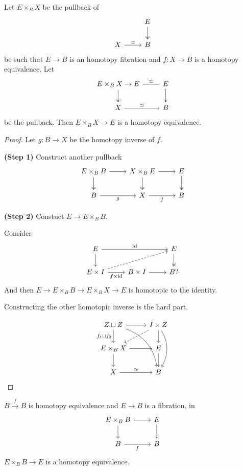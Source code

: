 \documentclass{article}
\DeclareMathOperator{\id}{id}
\begin{document}
\begin{lemma}
	Let $E\times_BX$ be the pullback of
	\[\begin{tikzcd}
		&E\arrow[d,two heads]\\
		X\arrow[r,"\simeq"]&B
	\end{tikzcd}\]
	be such that $E\to B$ is an homotopy fibration and $f:X\to B$ is a homotopy equivalence. Let
	\[\begin{tikzcd}
		E\times_BX\to E\arrow[r,dash,"\simeq"]\arrow[d,two heads]&E\arrow[d,two heads]\\
		X\arrow[r,"\simeq"]&B
	\end{tikzcd}\]
	be the pullback. Then $E\times_BX\to E$ is a homotopy equivalence.
\end{lemma}
\begin{proof}
	Let $g:B\to X$ be the homotopy inverse of $f$.
	
	\textbf{(Step 1)} Construct another pullback
	\[\begin{tikzcd}
		E\times_BB\arrow[r]\arrow[d,two heads]&X\times_BE\arrow[r]\arrow[d,two heads]&E\arrow[d,two heads]\\
		B\arrow[r,"g",swap]&X\arrow[r,"f",swap]&B
	\end{tikzcd}\]
	
	\textbf{(Step 2)} Constuct $E\to E\times_BB$.
	
	Consider
	\[\begin{tikzcd}
		E\arrow[rr,"\id"]\arrow[d]&&E\arrow[d,two heads]\\
		E\times I\arrow[r,"f\times \id",swap]\arrow[rru,dashed]&B\times I\arrow[r]&B?
	\end{tikzcd}\]
	And then $E\to E\times_BB\to E\times_BX\to E$ is homotopic to the identity.
	
	Constructing the other homotopic inverse is the hard part.
	
	\[\begin{tikzcd}
		Z\sqcup Z\arrow[d,swap,"f_1\sqcup f_2"]\arrow[r]\arrow[rdd,bend left]&I\times Z\arrow[ld,dashed]\arrow[d]\arrow[dd,bend left]\\
		E\times_BX\arrow[r]\arrow[d]&E\arrow[d]\\
		X\arrow[r,"\simeq"]&B
	\end{tikzcd}\]
\end{proof}
\begin{coro}
	$B\overset{f}{\to}B$ is homotopy equivalence and $E\to B$ is a fibration, in
	\[\begin{tikzcd}
		E\times_BB\arrow[d]\arrow[r]&E\arrow[d]\\
		B\arrow[r,"f",swap]&B
	\end{tikzcd}\]
	$E\times_BB\to E$ is a homotopy equivalence.
\end{coro}
\end{document}
